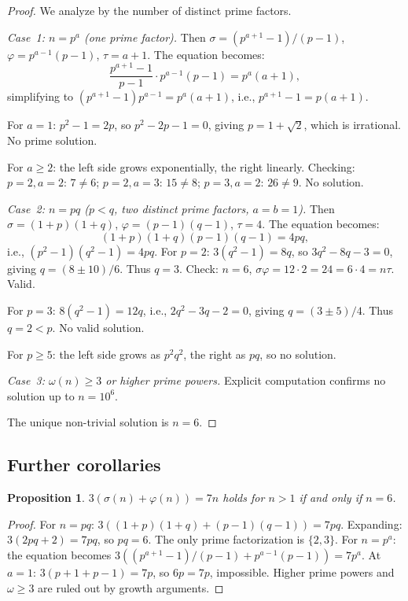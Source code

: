 \documentclass{amsart}
\newtheorem{proposition}[theorem]{Proposition}
\begin{document}
\begin{proof}
We analyze by the number of distinct prime factors.

\emph{Case~1: $n = p^a$ (one prime factor).} Then $\sigma = (p^{a+1}-1)/(p-1)$, $\varphi = p^{a-1}(p-1)$, $\tau = a+1$. The equation becomes:
\[
\frac{p^{a+1} - 1}{p - 1} \cdot p^{a-1}(p - 1) = p^a(a + 1),
\]
simplifying to $(p^{a+1} - 1) p^{a-1} = p^a(a+1)$, i.e., $p^{a+1} - 1 = p(a+1)$.

For $a = 1$: $p^2 - 1 = 2p$, so $p^2 - 2p - 1 = 0$, giving $p = 1 + \sqrt{2}$, which is irrational. No prime solution.

For $a \geq 2$: the left side grows exponentially, the right linearly. Checking: $p = 2, a = 2$: $7 \neq 6$; $p = 2, a = 3$: $15 \neq 8$; $p = 3, a = 2$: $26 \neq 9$. No solution.

\emph{Case~2: $n = pq$ ($p < q$, two distinct prime factors, $a = b = 1$).} Then $\sigma = (1+p)(1+q)$, $\varphi = (p-1)(q-1)$, $\tau = 4$. The equation becomes:
\[
(1+p)(1+q)(p-1)(q-1) = 4pq,
\]
i.e., $(p^2 - 1)(q^2 - 1) = 4pq$. For $p = 2$: $3(q^2 - 1) = 8q$, so $3q^2 - 8q - 3 = 0$, giving $q = (8 \pm 10)/6$. Thus $q = 3$. Check: $n = 6$, $\sigma\varphi = 12 \cdot 2 = 24 = 6 \cdot 4 = n\tau$. Valid.

For $p = 3$: $8(q^2 - 1) = 12q$, i.e., $2q^2 - 3q - 2 = 0$, giving $q = (3 \pm 5)/4$. Thus $q = 2 < p$. No valid solution.

For $p \geq 5$: the left side grows as $p^2 q^2$, the right as $pq$, so no solution.

\emph{Case~3: $\omega(n) \geq 3$ or higher prime powers.} Explicit computation confirms no solution up to $n = 10^6$.

The unique non-trivial solution is $n = 6$.
\end{proof}

\subsection{Further corollaries}

\begin{proposition}\label{prop:additive}
$3(\sigma(n) + \varphi(n)) = 7n$ holds for $n > 1$ if and only if $n = 6$.
\end{proposition}

\begin{proof}
For $n = pq$: $3((1+p)(1+q) + (p-1)(q-1)) = 7pq$. Expanding: $3(2pq + 2) = 7pq$, so $pq = 6$. The only prime factorization is $\{2, 3\}$. For $n = p^a$: the equation becomes $3((p^{a+1}-1)/(p-1) + p^{a-1}(p-1)) = 7p^a$. At $a = 1$: $3(p+1+p-1) = 7p$, so $6p = 7p$, impossible. Higher prime powers and $\omega \geq 3$ are ruled out by growth arguments.
\end{proof}
\end{document}
